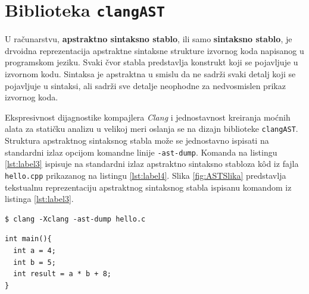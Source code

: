 \documentclass[12pt,oneside]{memoir}
\begin{document}

\section{Biblioteka \texttt{clangAST}}
\label{sec:clangASTSec}
U računarstvu, \textbf{apstraktno sintaksno stablo}, ili samo \textbf{sintaksno stablo}, je drvoidna reprezentacija apstraktne sintaksne strukture izvornog koda napisanog u programskom jeziku. Svaki čvor stabla predstavlja konstrukt koji se pojavljuje u izvornom kodu.
Sintaksa je apstraktna u smislu da ne sadr\v{z}i svaki detalj koji se pojavljuje u sintaksi, ali sadr\v{z}i sve detalje neophodne za nedvosmislen prikaz izvornog koda.

Ekspresivnost dijagnostike kompajlera \textit{Clang} i jednostavnost kreiranja mo\'{c}nih alata za stati\v{c}ku analizu u velikoj meri oslanja se na dizajn biblioteke \texttt{clangAST}. Struktura apstraktnog sintaksnog stabla mo\v{z}e se jednostavno ispisati na standardni izlaz opcijom komandne linije \texttt{-ast-dump}. Komanda na listingu \ref{lst:label3} ispisuje na standardni izlaz apstraktno sintaksno stabloza k\^{o}d iz fajla \texttt{hello.cpp} prikazanog na listingu \ref{lst:label4}. Slika \ref{fig:ASTSlika} predstavlja tekstualnu reprezentaciju apstraktnog sintaksnog stabla ispisanu komandom iz listinga \ref{lst:label3}.
\\


\begin{lstlisting}[style=custombash, caption={Komanda za ispisivanje apstraktnog sintaksnog stabla kompajlera \textit{Clang}.}, label=lst:label3]
$ clang -Xclang -ast-dump hello.c
\end{lstlisting}

\begin{lstlisting}[style=customc, caption={K\^{o}d \v{c}ije je apstraktno sintaksno stablo prikazano na slici \ref{fig:ASTSlika}.},label=lst:label4]
int main(){
  int a = 4;
  int b = 5;
  int result = a * b + 8;
}
\end{lstlisting}
\end{document}
